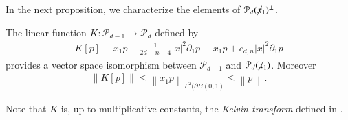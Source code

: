 \documentclass[11pt]{article}
\begin{document}
In the next proposition, we characterize the elements of ${\mathcal{P}}_d(\cancel x_1)^\perp$.
\begin{proposition}
 The linear function $K:{\mathcal{P}}_{d-1}\to{\mathcal{P}}_d$ defined by
 \begin{gather}
  K[p]\equiv x_1p - \frac 1 {2d+n-4} {\left|x\right|}^2 \partial_1 p \equiv x_1p +c_{d,n} {\left|x\right|}^2 \partial_1 p 
 \end{gather}
provides a vector space isomorphism between ${\mathcal{P}}_{d-1}$ and ${\mathcal{P}}_{d}(\cancel x_1)$. Moreover
\begin{gather}\label{eq_K-}
 {\left\|{K[p]}\right\|}\leq {\left\|{x_1 p}\right\|}_{L^2(\partial B(0,1)}\leq {\left\|{p}\right\|}\, .
\end{gather}

\end{proposition}
\begin{remark}
 Note that $K$ is, up to multiplicative constants, the \textit{Kelvin transform} defined in \cite{HFT}.
\end{remark}
\end{document}
